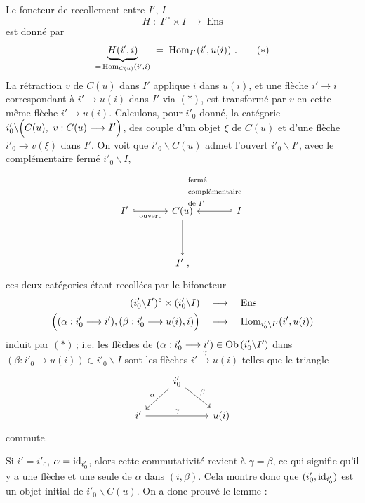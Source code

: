 Le foncteur de recollement entre $I'$, $I$
\[
H \;:\; I'^\circ\times I \;\longrightarrow\; \mathrm{Ens}
\]
est donné par
\[
\underbrace{H(i',i)}_{=\,\operatorname{Hom}_{C(u)}(i',i)} \;=\; \operatorname{Hom}_{I'}(i',u(i))\ . \tag*{$(*)$}
\]
La rétraction $v$ de $C(u)$ dans $I'$ applique $i$ dans $u(i)$, et une flèche $i'\longrightarrow i$ correspondant à $i'\longrightarrow u(i)$ dans $I'$ via $(*)$, est transformé par $v$ en cette même flèche $i'\longrightarrow u(i)$. Calculons, %
pour $i'_0$ donné, la catégorie $i'_0\backslash\Bigl(C(u),\ v : C(u)\longrightarrow I'\Bigr)$, des couple d'un objet $\xi$ de $C(u)$ %
et d'une flèche $i'_0\longrightarrow v(\xi)$ dans $I'$. On voit que $i'_0\backslash C(u)$ admet l'ouvert $i'_0\backslash I'$, avec le complémentaire fermé $i'_0\backslash I$,
\[
\begin{tikzcd}[column sep=large, row sep=huge]
I' \arrow[r, hook, "\text{ouvert}"'] & C(u) \arrow[d] & I \arrow[l, hook', "\begin{array}{l}\text{fermé}\\ \text{complémentaire}\\ \text{de } I'\end{array}"'] \\
 & I'\ ,
\end{tikzcd}
\]
ces deux catégories étant recollées par le bifoncteur
\[
\begin{aligned}
(i'_0\backslash I')^\circ \times (i'_0\backslash I) &\quad\longrightarrow\quad \mathrm{Ens}\\
\Bigl((\alpha : i'_0\longrightarrow i'), (\beta : i'_0\longrightarrow u(i), i)\Bigr) &\quad\longmapsto\quad \operatorname{Hom}_{i'_0\backslash I'}(i',u(i))
\end{aligned}
\]
induit par $(*)$\,; i.e. les flèches de $(\alpha : i'_0\longrightarrow i') \in \operatorname{Ob}\,(i'_0\backslash I')$ dans $(\beta : i'_0\longrightarrow u(i)) \in i'_0\backslash I$ sont les flèches $i' \xrightarrow{\gamma} u(i)$ telles que le triangle
\[
\begin{tikzcd}
 & i'_0 \arrow[dl, "\alpha"'] \arrow[dr, "\beta"] & \\
i' \arrow[rr, "\gamma"] & & u(i)
\end{tikzcd}
\]
commute.

Si $i' = i'_0$, $\alpha = \mathrm{id}_{i'_0}$, alors cette commutativité revient à $\gamma = \beta$, ce qui signifie qu'il y a une flèche et une seule de $\alpha$ dans $(i,\beta)$. Cela montre donc que $(i'_0,\mathrm{id}_{i'_0})$ est un objet initial de $i'_0\backslash C(u)$. On a donc prouvé le lemme :


